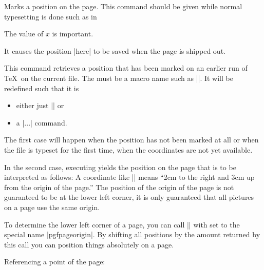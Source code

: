 \begin{command}{\pgfsys@markposition{}}
  Marks a position on the page. This command should be given while
  normal typesetting is done such as in
\begin{codeexample}
The value of $x$ is important.
\end{codeexample}
  It causes the position |here| to be saved when the page is shipped
  out.
\end{command}

\begin{command}{\pgfsys@getposition{}}
  This command retrieves a position that has been marked on an earlier
  run of \TeX\ on the current file. The  must be a macro
  name such as |\mymacro|. It will be redefined such that it is
  \begin{itemize}
  \item either just |\relax| or
  \item a |\pgfpoint...| command.
  \end{itemize}
  The first case will happen when the position has not been marked at
  all or when the file is typeset for the first time, when the
  coordinates are not yet available.

  In the second case, executing  yields the position on
  the page that is to be interpreted as follows: A coordinate like
  |\pgfpoint{2cm}{3cm}| means ``2cm to the right and 3cm up from the
  origin of the page.'' The position of the origin of the page is not
  guaranteed to be at the lower left corner, it is only guaranteed
  that all pictures on a page use the same origin.

  To determine the lower left corner of a page, you can call
  |\pgfsys@getposition| with  set to the special name
  |pgfpageorigin|. By shifting all positions by the amount returned by
  this call you can position things absolutely on a page.

  \example Referencing a point of the page:
\end{command}


